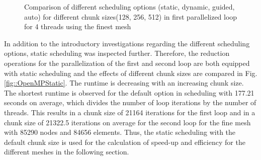 \documentclass[a4paper, 11pt, oneside]{scrartcl}
\newcommand{\refFig}[1]{Fig. \ref{#1}}
\begin{document}
\begin{figure}[h!]
	\centering
	\caption{\label{fig::Scheduling} Comparison of different scheduling options (static, dynamic, guided, auto) for different chunk sizes(128, 256, 512) in first parallelized loop for 4 threads using the finest mesh}
\end{figure}

In addition to the introductory investigations regarding the different scheduling options, static scheduling was inspected further. Therefore, the reduction operations for the parallelization of the first and second loop are both equipped with static scheduling and the effects of different chunk sizes are compared in \refFig{fig::OpenMPStatic}. The runtime is decreasing with an increasing chunk size. The shortest runtime is observed for the default option in scheduling with 177.21 seconds on average, which divides the number of loop iterations by the number of threads. This results in a chunk size of 21164 iterations for the first loop and in a chunk size of 21322.5 iterations on average for the second loop for the fine mesh with 85290 nodes and 84656 elements. Thus, the static scheduling with the default chunk size is used for the calculation of speed-up and efficiency for the different meshes in the following section.
\end{document}
